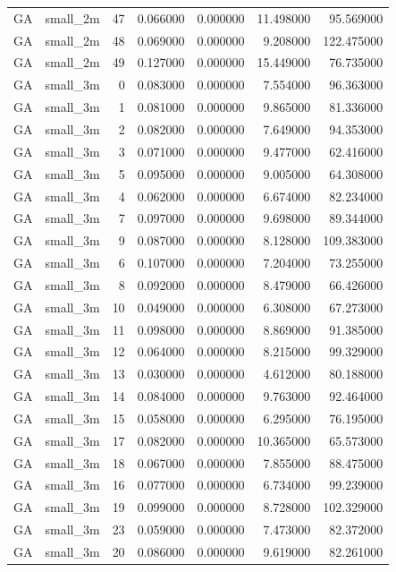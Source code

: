 \begin{tabular}{llrrrrr}
GA & small_2m & 47 & 0.066000 & 0.000000 & 11.498000 & 95.569000 \\
GA & small_2m & 48 & 0.069000 & 0.000000 & 9.208000 & 122.475000 \\
GA & small_2m & 49 & 0.127000 & 0.000000 & 15.449000 & 76.735000 \\
GA & small_3m & 0 & 0.083000 & 0.000000 & 7.554000 & 96.363000 \\
GA & small_3m & 1 & 0.081000 & 0.000000 & 9.865000 & 81.336000 \\
GA & small_3m & 2 & 0.082000 & 0.000000 & 7.649000 & 94.353000 \\
GA & small_3m & 3 & 0.071000 & 0.000000 & 9.477000 & 62.416000 \\
GA & small_3m & 5 & 0.095000 & 0.000000 & 9.005000 & 64.308000 \\
GA & small_3m & 4 & 0.062000 & 0.000000 & 6.674000 & 82.234000 \\
GA & small_3m & 7 & 0.097000 & 0.000000 & 9.698000 & 89.344000 \\
GA & small_3m & 9 & 0.087000 & 0.000000 & 8.128000 & 109.383000 \\
GA & small_3m & 6 & 0.107000 & 0.000000 & 7.204000 & 73.255000 \\
GA & small_3m & 8 & 0.092000 & 0.000000 & 8.479000 & 66.426000 \\
GA & small_3m & 10 & 0.049000 & 0.000000 & 6.308000 & 67.273000 \\
GA & small_3m & 11 & 0.098000 & 0.000000 & 8.869000 & 91.385000 \\
GA & small_3m & 12 & 0.064000 & 0.000000 & 8.215000 & 99.329000 \\
GA & small_3m & 13 & 0.030000 & 0.000000 & 4.612000 & 80.188000 \\
GA & small_3m & 14 & 0.084000 & 0.000000 & 9.763000 & 92.464000 \\
GA & small_3m & 15 & 0.058000 & 0.000000 & 6.295000 & 76.195000 \\
GA & small_3m & 17 & 0.082000 & 0.000000 & 10.365000 & 65.573000 \\
GA & small_3m & 18 & 0.067000 & 0.000000 & 7.855000 & 88.475000 \\
GA & small_3m & 16 & 0.077000 & 0.000000 & 6.734000 & 99.239000 \\
GA & small_3m & 19 & 0.099000 & 0.000000 & 8.728000 & 102.329000 \\
GA & small_3m & 23 & 0.059000 & 0.000000 & 7.473000 & 82.372000 \\
GA & small_3m & 20 & 0.086000 & 0.000000 & 9.619000 & 82.261000 \\

\end{tabular}

